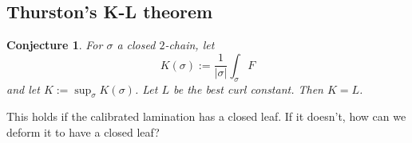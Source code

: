\documentclass[reqno,11pt]{amsart}
\newtheorem{conjecture}[theorem]{Conjecture}
\theoremstyle{definition}
\numberwithin{equation}{section}
\begin{document}
\subsection{Thurston's K-L theorem}
\begin{conjecture}
For $\sigma$ a closed $2$-chain, let
$$K(\sigma) := \frac{1}{|\sigma|} \int_\sigma F$$
and let $K := \sup_\sigma K(\sigma)$.
Let $L$ be the best curl constant. Then $K = L$.
\end{conjecture}

This holds if the calibrated lamination has a closed leaf.
If it doesn't, how can we deform it to have a closed leaf?



\printbibliography
\end{document}
